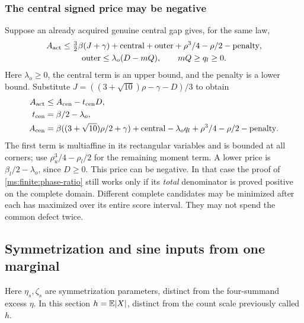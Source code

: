 \subsubsection{The central signed price may be negative}
Suppose an already acquired genuine central gap gives, for the same law,
\[
 \begin{gathered}
 A_{\rm act}\le\tfrac32\beta(J+\gamma)+\mathrm{central}
 +\mathrm{outer}+\rho^3/4-\rho/2-\mathrm{penalty},\\
 \mathrm{outer}\le\lambda_o(D-mQ),\qquad mQ\ge q_l\ge0.
 \end{gathered}
\]
Here $\lambda_o\ge0$, the central term is an upper bound, and the
penalty is a lower bound. Substitute
$J=((3+\sqrt{10})\rho-\gamma-D)/3$ to obtain
\begin{align}
 A_{\rm act}&\le A_{\rm cen}-t_{\rm cen}D,\notag\\
 t_{\rm cen}&=\beta/2-\lambda_o,\notag\\
 A_{\rm cen}&=\beta((3+\sqrt{10})\rho/2+\gamma)
  +\mathrm{central}-\lambda_oq_l+\rho^3/4-\rho/2-\mathrm{penalty}.
 \label{ms:finite:central-price}
\end{align}
The first term is multiaffine in its rectangular variables and is
bounded at all corners; use $\rho_u^3/4-\rho_l/2$ for the remaining
moment term. A lower price is $\beta_l/2-\lambda_o$, since $D\ge0$.
This price can be negative. In that case the proof of
\eqref{ms:finite:phase-ratio} still works only if its \emph{total}
denominator is proved positive on the complete domain. Different
complete candidates may be minimized after each has maximized over
its entire score interval. They may not spend the common defect twice.


\subsection{Symmetrization and sine inputs from one marginal}
\label{ms:finite:symmetrization}
Here $\eta_s,\zeta_s$ are symmetrization parameters, distinct from the
four-summand excess $\eta$. In this section $h=\mathbb E|X|$, distinct from
the count scale previously called $h$.

